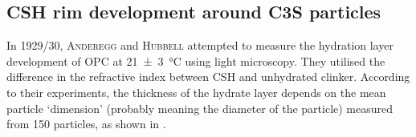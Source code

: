 
\subsection{\acs*{CSH} rim development around \acs*{C3S} particles}

In 1929/30, \textsc{Anderegg} and \textsc{Hubbell} \cite{anderegg.1929,anderegg.1930} attempted to measure the hydration layer development of \ac{OPC} at \qty{21(3)}{\celsius} using light microscopy.
They utilised the difference in the refractive index between \ac{CSH} and unhydrated clinker.
According to their experiments, the thickness of the hydrate layer depends on the mean particle `dimension' (probably meaning the diameter of the particle) measured from \num{150} particles, as shown in .

